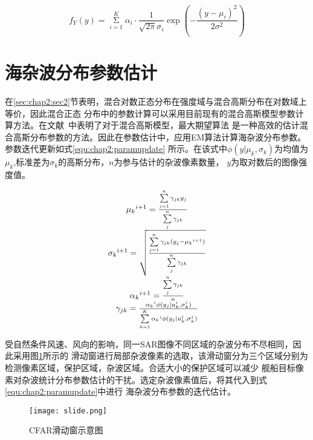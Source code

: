     \begin{equation}
      \label{equ:chap2:GMM}
        {f_Y}(y) = \mathop \Sigma \limits_{i = 1}^K {\alpha _i} \cdot \frac{1}{{\sqrt {2\pi } {\sigma _i}}}\exp ( - \frac{{{{(y - {\mu _i})}^2}}}{{2{\sigma ^2}}})
    \end{equation}


  \section{海杂波分布参数估计}

      在\ref{sec:chap2:sec2}节表明，混合对数正态分布在强度域与混合高斯分布在对数域上等价，因此混合正态
      分布中的参数计算可以采用目前现有的混合高斯模型参数计算方法。在文献~\cite{6087012}中表明了对于混合高斯模型，最大期望算法
      是一种高效的估计混合高斯分布参数的方法。因此在参数估计中，应用EM算法计算海杂波分布参数。参数迭代更新如式\ref{equ:chap2:paramupdate}
      所示。在该式中$\phi (y|{\mu _k},{\sigma _k})$为均值为$\mu_k$,标准差为$\sigma_k$的高斯分布，$n$为参与估计的杂波像素数量，
      $y$为取对数后的图像强度值。      

    \begin{equation}
      \label{equ:chap2:paramupdate}
      \begin{array}{*{20}{c}}
        {{\mu _k}^{i + 1} = \frac{{\sum\limits_{j = 1}^n {{\gamma _{jk}}{y_j}} }}{{\sum\limits_j^n {{\gamma _{jk}}} }}}\\
        {{\sigma _k}^{{\rm{i}} + 1} = \sqrt {\frac{{\sum\limits_{j = 1}^n {{\gamma _{jk}}({y_j} - {\mu _k}^{i + 1})} }}{{\sum\limits_j^n {{\gamma _{jk}}} }}} }\\
        {{\alpha _k}^{i + 1} = \frac{{\sum\limits_j^n {{\gamma _{jk}}} }}{n}}\\
        {{\gamma _{jk}} = \frac{{{\alpha _k}^i\phi ({y_j}|u_k^i,\sigma _k^i)}}{{\sum\limits_{k = 1}^K {{\alpha _k}^i\phi ({y_j}|u_k^i,\sigma _k^i)} }}}
      \end{array}
    \end{equation}

    受自然条件风速、风向的影响，同一SAR图像不同区域的杂波分布不尽相同，因此采用图\ref{fig:chap2:slide}所示的
    滑动窗进行局部杂波像素的选取，该滑动窗分为三个区域分别为检测像素区域，保护区域，杂波区域。合适大小的保护区域可以减少
    舰船目标像素对杂波统计分布参数估计的干扰。选定杂波像素值后，将其代入到式\ref{equ:chap2:paramupdate}中进行
    海杂波分布参数的迭代估计。

    \begin{figure}[H] %
      \centering
      \texttt{[image: slide.png]}
      \caption{CFAR滑动窗示意图}
      \label{fig:chap2:slide}
    \end{figure}   
